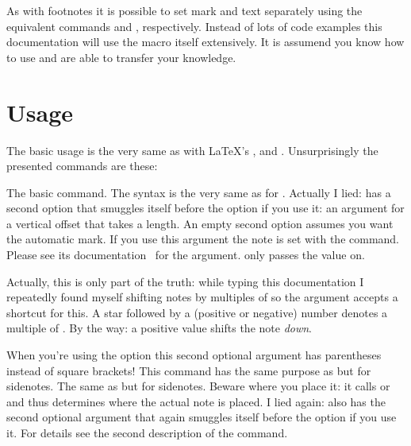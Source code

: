 \documentclass[toc=index,toc=bib,mpinclude]{cnpkgdoc}
\makeatletter
\providecommand*\sinceversion[1]{%
  \@bsphack
  \marginnote{%
    \footnotesize\sffamily\RaggedRight
    \textcolor{black!75}{Introduced in version~#1}}%
  \@esphack}
\makeatother
\begin{document}
As with footnotes it is possible to set mark and text separately using the
equivalent commands  and , respectively.
Instead of lots of code examples this documentation will use the 
macro itself extensively. It is assumend you know how to use  and
are able to transfer your knowledge.

\section{Usage}
The basic usage is the very same as with \LaTeX's , 
and . Unsurprisingly the presented commands are these:
\begin{beschreibung}
 \newline
   The basic command. The syntax is the very same as for .
 \newline
   Actually I lied:  has a second option that smuggles itself
   before the  option if you use it: an argument for a vertical offset
   that takes a length. An empty second option assumes you want the automatic
   mark. If you use this argument the note is set with the 
   command.
   Please see its documentation~\cite{pkg:marginnote} for the 
   argument. \snotez only passes the value on.\par
   \sinceversion{0.3} Actually, this is only part of the truth: while typing this
   documentation I repeatedly found myself shifting notes by multiples of
    so the argument accepts a shortcut for this. A star \code{*}
   followed by a (positive or negative) number denotes a multiple of .
   By the way: a positive value shifts the note \emph{down}.\par
   When you're using the  option this second optional argument
   has parentheses instead of square brackets!
 \newline
   This command has the same purpose as  but for sidenotes.
 \newline
   The same as  but for sidenotes. Beware where you place it:
   it calls  or  and thus determines where the
   actual note is placed.
 \newline
   I lied again:  also has the second optional argument
    that again smuggles itself before the  option if you
   use it. For details see the second description of the  command.
\end{beschreibung}
\end{document}
